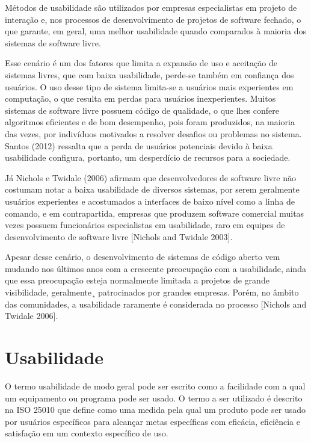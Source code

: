 \documentclass[12pt]{article}
\begin{document}
Métodos de usabilidade são utilizados por empresas especialistas em projeto de interação e, nos processos de desenvolvimento de projetos de software fechado, o que garante, em geral, uma melhor usabilidade quando comparados à maioria dos sistemas de software livre.
%

Esse cenário é um dos fatores que limita a expansão de uso e aceitação de sistemas livres, que com baixa usabilidade, perde-se também em confiança dos usuários. O uso desse tipo de sistema limita-se a usuários mais experientes em computação, o que resulta em perdas para usuários inexperientes. Muitos sistemas de software livre possuem código de qualidade, o que lhes confere algoritmos eficientes e de bom desempenho, pois foram produzidos, na maioria das vezes, por indivíduos motivados a resolver desafios ou problemas no sistema. Santos (2012) ressalta que a perda de usuários potenciais devido à baixa usabilidade configura, portanto, um desperdício de recursos para a sociedade.

%
Já Nichols e Twidale (2006) afirmam que desenvolvedores de software livre não costumam notar a baixa usabilidade de diversos sistemas, por serem geralmente usuários experientes e acostumados a interfaces de baixo nível como a linha de comando, e em contrapartida, empresas que produzem software comercial muitas vezes possuem funcionários especialistas em usabilidade, raro em equipes de desenvolvimento de software livre [Nichols and Twidale 2003].
%

Apesar desse cenário, o desenvolvimento de sistemas de código aberto vem mudando nos últimos anos com a crescente preocupação com a usabilidade, ainda que essa preocupação esteja normalmente limitada a projetos de grande visibilidade, geralmente¸ patrocinados por grandes empresas. Porém, no âmbito das comunidades, a usabilidade raramente é considerada no processo [Nichols and Twidale 2006].

\section{Usabilidade}
\label{sec:usabilidade}
O termo usabilidade de modo geral pode ser escrito como a facilidade com a qual um equipamento ou programa pode ser usado. O termo a ser utilizado é descrito na ISO 25010 que define como uma medida pela qual um produto pode ser usado por usuários específicos para alcançar metas específicas com eficácia, eficiência e satisfação em um contexto específico de uso.
\end{document}
